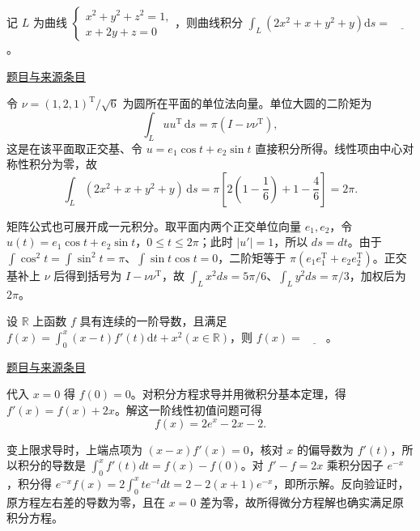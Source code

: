 \documentclass[12pt,fontset=fandol]{ctexart}
\begin{document}
\begin{example}[来源序号2]\label{ex:fin14-high:2}\label{pr:fin14-high:2}

记 $L$ 为曲线 $\begin{cases} x^2+y^2+z^2=1, \\ x+2y+z=0 \end{cases}$，则曲线积分 $\int_L \left(2x^2+x+y^2+y\right) \mathrm{d} s=$$\underline{\qquad}$。

\par\href{https://github.com/lzxcr/cmc-mathematics/blob/64916fa1fdbc3e444a652eca204d5669058ee321/src/problems/finals/14/02.md}{题目与来源条目}

\end{example}

\begin{solve}\label{ans:fin14-high:2}

令 $\nu=(1,2,1)^{\mathrm T}/\sqrt6$ 为圆所在平面的单位法向量。单位大圆的二阶矩为
\[
\int_L uu^{\mathrm T}\,\mathrm ds=\pi(I-\nu\nu^{\mathrm T}),
\]
这是在该平面取正交基、令 $u=e_1\cos t+e_2\sin t$ 直接积分所得。线性项由中心对称性积分为零，故
\[
\int_L(2x^2+x+y^2+y)\,\mathrm ds
=\pi\left[2\left(1-\frac16\right)+1-\frac46\right]=\boxed{2\pi}.
\]

矩阵公式也可展开成一元积分。取平面内两个正交单位向量 $e_1,e_2$，令 $u(t)=e_1\cos t+e_2\sin t$，$0\le t\le2\pi$；此时 $|u'|=1$，所以 $ds=dt$。由于 $\int\cos^2t=\int\sin^2t=\pi$、$\int\sin t\cos t=0$，二阶矩等于 $\pi(e_1e_1^{\mathrm T}+e_2e_2^{\mathrm T})$。正交基补上 $\nu$ 后得到括号为 $I-\nu\nu^{\mathrm T}$，故 $\int_Lx^2ds=5\pi/6$、$\int_Ly^2ds=\pi/3$，加权后为 $2\pi$。

\end{solve}

\begin{example}[来源序号4]\label{ex:fin14-high:4}\label{pr:fin14-high:4}

设 $\mathbb{R}$ 上函数 $f$ 具有连续的一阶导数，且满足 $f(x)=\int_0^x (x-t)f'(t) \mathrm{d} t+x^2(x \in \mathbb{R})$，则 $f(x)=$$\underline{\qquad}$。

\par\href{https://github.com/lzxcr/cmc-mathematics/blob/64916fa1fdbc3e444a652eca204d5669058ee321/src/problems/finals/14/04.md}{题目与来源条目}

\end{example}

\begin{solve}\label{ans:fin14-high:4}

代入 $x=0$ 得 $f(0)=0$。对积分方程求导并用微积分基本定理，得 $f'(x)=f(x)+2x$。解这一阶线性初值问题可得
\[
\boxed{f(x)=2e^x-2x-2}.
\]

变上限求导时，上端点项为 $(x-x)f'(x)=0$，核对 $x$ 的偏导数为 $f'(t)$，所以积分的导数是 $\int_0^xf'(t)dt=f(x)-f(0)$。对 $f'-f=2x$ 乘积分因子 $e^{-x}$，积分得 $e^{-x}f(x)=2\int_0^xte^{-t}dt=2-2(x+1)e^{-x}$，即所示解。反向验证时，原方程左右差的导数为零，且在 $x=0$ 差为零，故所得微分方程解也确实满足原积分方程。

\end{solve}
\end{document}

